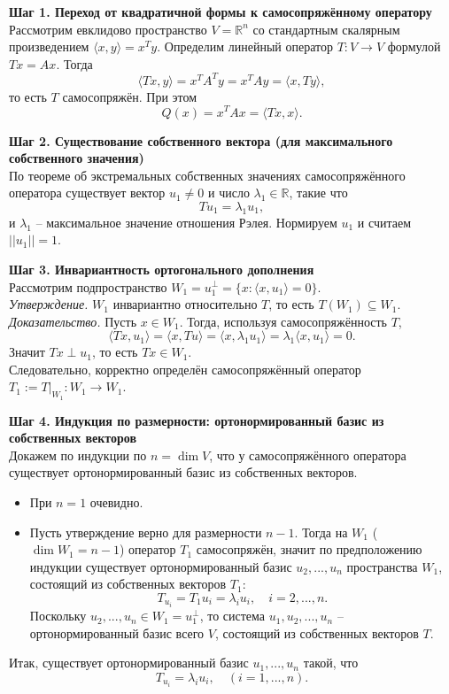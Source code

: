 \documentclass[14pt]{extreport}
\begin{document}
    \begin{prbox}
        \textbf{Шаг 1. Переход от квадратичной формы к самосопряжённому оператору}\\
        Рассмотрим евклидово пространство $V = \mathbb{R}^n$ со стандартным скалярным произведением $\langle x,y \rangle = x^Ty$. Определим линейный оператор $T: V \rightarrow V$ формулой $Tx = Ax$. Тогда
        \[
        \langle Tx,y \rangle = x^TA^Ty = x^TAy = \langle x,Ty \rangle,
        \]
        то есть $T$ самосопряжён. При этом
        \[
        Q(x) = x^TAx = \langle Tx,x \rangle.
        \]

        \textbf{Шаг 2. Существование собственного вектора (для максимального собственного значения)}\\
        По теореме об экстремальных собственных значениях самосопряжённого оператора существует вектор $u_1 \neq 0$ и число $\lambda_1 \in \mathbb{R}$, такие что
        \[
        Tu_1 = \lambda_1 u_1,
        \]
        и $\lambda_1$ – максимальное значение отношения Рэлея. Нормируем $u_1$ и считаем $||u_1||=1$.

        \textbf{Шаг 3. Инвариантность ортогонального дополнения}\\
        Рассмотрим подпространство $W_1 = u_1^\perp = \{ x: \langle x,u_1 \rangle = 0 \}$.\\
        \textit{Утверждение.} $W_1$ инвариантно относительно $T$, то есть $T(W_1) \subseteq W_1$.\\
        \textit{Доказательство.} Пусть $x \in W_1$. Тогда, используя самосопряжённость $T$,
        \[
        \langle Tx,u_1 \rangle = \langle x,Tu \rangle = \langle x,\lambda_1u_1 \rangle = \lambda_1 \langle x,u_1 \rangle = 0.
        \]
        Значит $Tx \perp u_1$, то есть $Tx \in W_1$.\\
        Следовательно, корректно определён самосопряжённый оператор $T_1 := T|_{W_1}: W_1 \rightarrow W_1$.

        \textbf{Шаг 4. Индукция по размерности: ортонормированный базис из собственных векторов}\\
        Докажем по индукции по $n = \dim V$, что у самосопряжённого оператора существует ортонормированный базис из собственных векторов.
        \begin{itemize}
            \item При $n=1$ очевидно.
            \item Пусть утверждение верно для размерности $n-1$. Тогда на $W_1$ ($\dim W_1 = n-1$) оператор $T_1$ самосопряжён, значит по предположению индукции существует ортонормированный базис $u_2,...,u_n$ пространства $W_1$, состоящий из собственных векторов $T_1$:
            \[
            T_{u_i} = T_1 u_i = \lambda_i u_i, \quad i = 2,...,n.
            \]
            Поскольку $u_2,...,u_n \in W_1 = u_1^\perp$, то система $u_1,u_2,...,u_n$ – ортонормированный базис всего $V$, состоящий из собственных векторов $T$.
        \end{itemize}
        Итак, существует ортонормированный базис $u_1,...,u_n$ такой, что
        \[
        T_{u_i} = \lambda_i u_i, \quad (i = 1,...,n).
        \]


\end{prbox}
\end{document}
